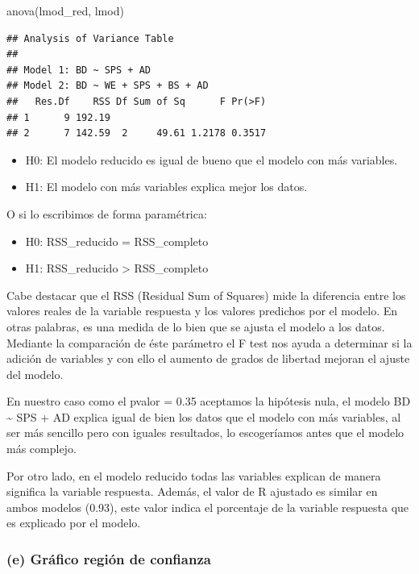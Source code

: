 \documentclass[
]{article}
\newenvironment{Shaded}{\begin{snugshade}}{\end{snugshade}}
\newcommand{\FunctionTok}[1]{\textcolor[rgb]{0.00,0.00,0.00}{#1}}
\newcommand{\NormalTok}[1]{#1}
\providecommand{\tightlist}{%
  \setlength{\itemsep}{0pt}\setlength{\parskip}{0pt}}
\begin{document}
\begin{Shaded}
\begin{Highlighting}[]
\FunctionTok{anova}\NormalTok{(lmod\_red, lmod)}
\end{Highlighting}
\end{Shaded}

\begin{verbatim}
## Analysis of Variance Table
## 
## Model 1: BD ~ SPS + AD
## Model 2: BD ~ WE + SPS + BS + AD
##   Res.Df    RSS Df Sum of Sq      F Pr(>F)
## 1      9 192.19                           
## 2      7 142.59  2     49.61 1.2178 0.3517
\end{verbatim}

\begin{itemize}
\tightlist
\item
  H0: El modelo reducido es igual de bueno que el modelo con más
  variables.
\item
  H1: El modelo con más variables explica mejor los datos.
\end{itemize}

O si lo escribimos de forma paramétrica:

\begin{itemize}
\tightlist
\item
  H0: RSS\_reducido = RSS\_completo
\item
  H1: RSS\_reducido \textgreater{} RSS\_completo
\end{itemize}

Cabe destacar que el RSS (Residual Sum of Squares) mide la diferencia
entre los valores reales de la variable respuesta y los valores
predichos por el modelo. En otras palabras, es una medida de lo bien que
se ajusta el modelo a los datos. Mediante la comparación de éste
parámetro el F test nos ayuda a determinar si la adición de variables y
con ello el aumento de grados de libertad mejoran el ajuste del modelo.

En nuestro caso como el pvalor = 0.35 aceptamos la hipótesis nula, el
modelo BD \textasciitilde{} SPS + AD explica igual de bien los datos que
el modelo con más variables, al ser más sencillo pero con iguales
resultados, lo escogeríamos antes que el modelo más complejo.

Por otro lado, en el modelo reducido todas las variables explican de
manera significa la variable respuesta. Además, el valor de R ajustado
es similar en ambos modelos (0.93), este valor indica el porcentaje de
la variable respuesta que es explicado por el modelo.

\hypertarget{e-gruxe1fico-regiuxf3n-de-confianza}{%
\subsubsection{(e) Gráfico región de
confianza}\label{e-gruxe1fico-regiuxf3n-de-confianza}}
\end{document}
